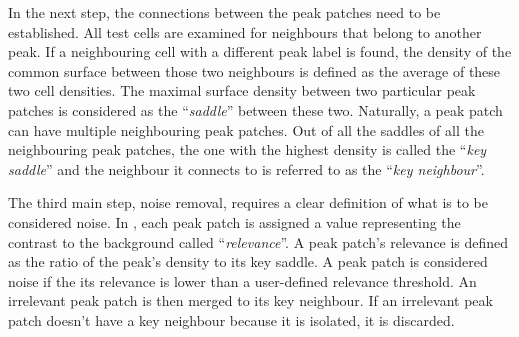 



In the next step, the connections between the peak patches need to be established. 
All test cells are examined for neighbours that belong to another peak. 
If a neighbouring cell with a different peak label is found, the density of the common surface between those two neighbours is defined as the average of these two cell densities.
The maximal surface density between two particular peak patches is considered as the ``\emph{saddle}'' between these two. 
Naturally, a peak patch can have multiple neighbouring peak patches. 
Out of all the saddles of all the neighbouring peak patches, the one with the highest density is called the ``\emph{key saddle}'' and the neighbour it connects to is referred to as the ``\emph{key neighbour}''.

The third main step, noise removal, requires a clear definition of what is to be considered noise. 
In \phew, each peak patch is assigned a value representing the contrast to the background called ``\emph{relevance}''.
A peak patch's relevance is defined as the ratio of the peak's density to its key saddle. 
A peak patch is considered noise if the its relevance is lower than a user-defined relevance threshold.
An irrelevant peak patch is then merged to its key neighbour. 
If an irrelevant peak patch doesn't have a key neighbour because it is isolated, it is discarded.



